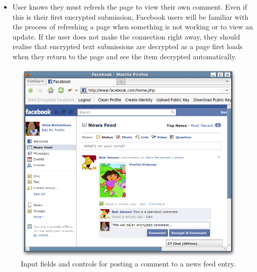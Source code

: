 \begin{desc}
\begin{itemize}
            \item User knows they must refresh the page to view their own comment. Even if this is their first encrypted submission, Facebook users will be familiar with the process of refreshing a page when something is not working or to view an update. If the user does not make the connection right away, they should realise that encrypted text submissions are decrypted as a page first loads when they return to the page and see the item decrypted automatically.
        
        \end{itemize}
\end{desc}


    \begin{figure}[tbph]
        \begin{center}
        
                \includegraphics[width=12cm]{screens/comment.png}

            \caption{Input fields and controls for posting a comment to a news feed entry.}
            \label{scn:comment}
        \end{center}
    \end{figure}